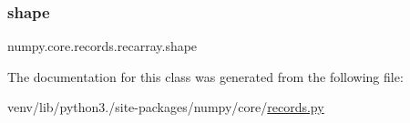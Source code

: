 \mbox{\label{classnumpy_1_1core_1_1records_1_1recarray_a13fed5b032b4bc1284b4e6f2848d49c7}} 
\subsubsection{\texorpdfstring{shape}{shape}}
{\footnotesize\ttfamily numpy.\+core.\+records.\+recarray.\+shape}



The documentation for this class was generated from the following file\+:\begin{DoxyCompactItemize}
\item 
venv/lib/python3./site-\/packages/numpy/core/\hyperlink{records_8py}{records.\+py}\end{DoxyCompactItemize}
